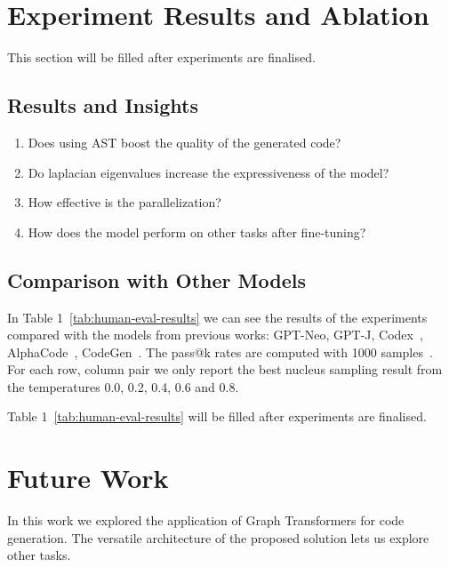 \documentclass[sigplan,screen,anonymous,natbib=false]{acmart}
\begin{document}
\section{Experiment Results and Ablation}\label{sec:experiment-results-and-ablation}

This section will be filled after experiments are finalised.

\subsection{Results and Insights}\label{subsec:results-and-insights}

\begin{enumerate}
    \item Does using AST boost the quality of the generated code?
    \item Do laplacian eigenvalues increase the expressiveness of the model?
    \item How effective is the parallelization?
    \item How does the model perform on other tasks after fine-tuning?
\end{enumerate}

\subsection{Comparison with Other Models}\label{subsec:comparison-with-other-models}

In Table 1~\ref{tab:human-eval-results} we can see the results of the experiments compared with the models from previous works: GPT-Neo, GPT-J, Codex~\cite{chen_evaluating_2021}, AlphaCode~\cite{li_competition-level_nodate}, CodeGen~\cite{nijkamp_conversational_2022}.
The pass@k rates are computed with 1000 samples~\cite{chen_evaluating_2021}.
For each row, column pair we only report the best nucleus sampling result from the temperatures 0.0, 0.2, 0.4, 0.6 and 0.8.

Table 1~\ref{tab:human-eval-results} will be filled after experiments are finalised.

\section{Future Work}\label{sec:future-work}

In this work we explored the application of Graph Transformers for code generation. 
The versatile architecture of the proposed solution lets us explore other tasks.
\end{document}
